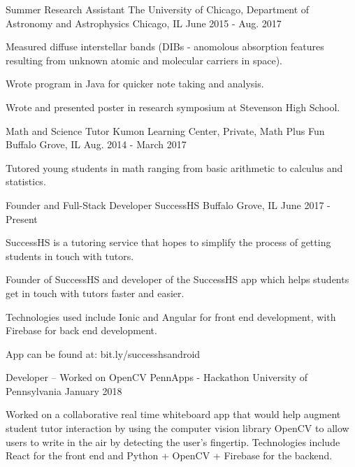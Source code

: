 \begin{cventries}
  \cventry
    {Summer Research Assistant}
    {The University of Chicago, Department of Astronomy and Astrophysics}
    {Chicago, IL}
    {June 2015 - Aug. 2017} 
    {
      \begin{cvitems}
        \item {Measured diffuse interstellar bands (DIBs - anomolous absorption features resulting from unknown atomic and molecular carriers in space).}
        \item {Wrote program in Java for quicker note taking and analysis.}
        \item {Wrote and presented poster in research symposium at Stevenson High School.}
      \end{cvitems}
    }
  \cventry
    {Math and Science Tutor}
    {Kumon Learning Center, Private, Math Plus Fun}
    {Buffalo Grove, IL}
    {Aug. 2014 - March 2017}
    {
      \begin{cvitems}
        \item {Tutored young students in math ranging from basic arithmetic to calculus and statistics.}
      \end{cvitems}
    }
  \cventry
    {Founder and Full-Stack Developer}
    {SuccessHS}
    {Buffalo Grove, IL}
    {June 2017 - Present}
    {
      \begin{cvitems}
        \item {SuccessHS is a tutoring service that hopes to simplify the process of getting students in touch with tutors.}
        \item {Founder of SuccessHS and developer of the SuccessHS app which helps students get in touch with tutors faster and easier.}
        \item {Technologies used include Ionic and Angular for front end development, with Firebase for back end development.}
        \item {App can be found at: bit.ly/successhsandroid}
      \end{cvitems}
    }
    
    \cventry
      {Developer -- Worked on OpenCV}
      {PennApps - Hackathon}
      {University of Pennsylvania}
      {January 2018}
      {
        \begin{cvitems}
            \item Worked on a collaborative real time whiteboard app that would help augment student tutor interaction by using the computer vision library OpenCV to allow users to write in the air by detecting the user's fingertip. Technologies include React for the front end and Python + OpenCV + Firebase for the backend.
        \end{cvitems}
    }
    

\end{cventries}
